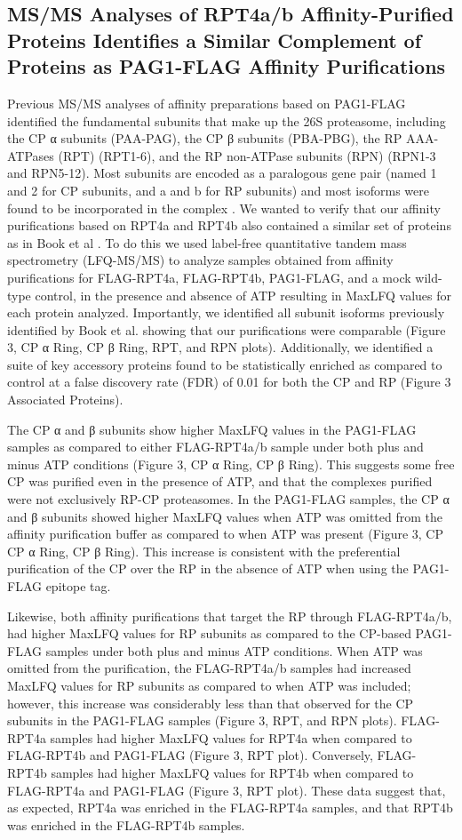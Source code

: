 \subsection{MS/MS Analyses of RPT4a/b Affinity-Purified Proteins Identifies a Similar Complement of Proteins as PAG1-FLAG Affinity Purifications}
	Previous MS/MS analyses of affinity preparations based on PAG1-FLAG identified the fundamental subunits that make up the 26S proteasome, including the CP α subunits (PAA-PAG), the CP β subunits (PBA-PBG), the RP AAA-ATPases (RPT) (RPT1-6), and the RP non-ATPase subunits (RPN) (RPN1-3 and RPN5-12). Most subunits are encoded as a paralogous gene pair (named 1 and 2 for CP subunits, and a and b for RP subunits) and most isoforms were found to be incorporated in the complex \citep{book10}. We wanted to verify that our affinity purifications based on RPT4a and RPT4b also contained a similar set of proteins as in Book et al \citep{book10}. To do this we used label-free quantitative tandem mass spectrometry (LFQ-MS/MS) to analyze samples obtained from affinity purifications for FLAG-RPT4a, FLAG-RPT4b, PAG1-FLAG, and a mock wild-type control, in the presence and absence of ATP resulting in MaxLFQ values \citep{cox14} for each protein analyzed. Importantly, we identified all subunit isoforms previously identified by Book et al. \citep{book10} showing that our purifications were comparable (Figure 3, CP α Ring, CP β Ring, RPT, and RPN plots).  Additionally, we identified a suite of key accessory proteins found to be statistically enriched as compared to control at a false discovery rate (FDR) of 0.01 for both the CP and RP (Figure 3 Associated Proteins).
	
	The CP α and β subunits show higher MaxLFQ values in the PAG1-FLAG samples as compared to either FLAG-RPT4a/b sample under both plus and minus ATP conditions (Figure 3, CP α Ring, CP β Ring). This suggests some free CP was purified even in the presence of ATP, and that the complexes purified were not exclusively RP-CP proteasomes. In the PAG1-FLAG samples, the CP α and β subunits showed higher MaxLFQ values when ATP was omitted from the affinity purification buffer as compared to when ATP was present (Figure 3, CP CP α Ring, CP β Ring). This increase is consistent with the preferential purification of the CP over the RP in the absence of ATP when using the PAG1-FLAG epitope tag.

	Likewise, both affinity purifications that target the RP through FLAG-RPT4a/b, had higher MaxLFQ values for RP subunits as compared to the CP-based PAG1-FLAG samples under both plus and minus ATP conditions. When ATP was omitted from the purification, the FLAG-RPT4a/b samples had increased MaxLFQ values for RP subunits as compared to when ATP was included; however, this increase was considerably less than that observed for the CP subunits in the PAG1-FLAG samples (Figure 3, RPT, and RPN plots). FLAG-RPT4a samples had higher MaxLFQ values for RPT4a when compared to FLAG-RPT4b and PAG1-FLAG (Figure 3, RPT plot). Conversely, FLAG-RPT4b samples had higher MaxLFQ values for RPT4b when compared to FLAG-RPT4a and PAG1-FLAG (Figure 3, RPT plot). These data suggest that, as expected, RPT4a was enriched in the FLAG-RPT4a samples, and that RPT4b was enriched in the FLAG-RPT4b samples.

